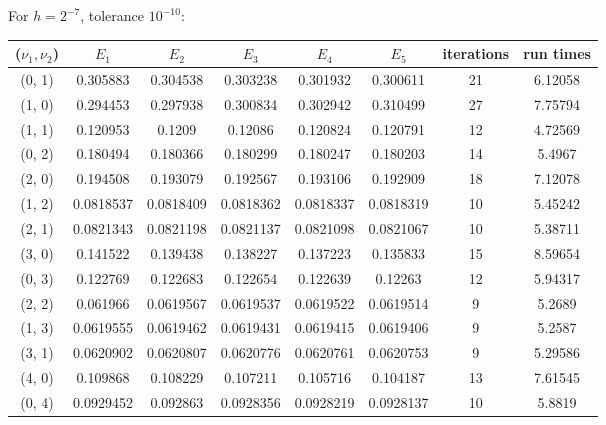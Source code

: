 \documentclass[12pt]{article}
\begin{document}
For $h=2^{-7}$, tolerance $10^{-10}$:
\begin{center}
\begin{tabular}{||c|ccccc|c|c||}
\hline \hline
 ($\nu_1, \nu_2$)   & $E_1$ & $E_2$ &  $E_3$ & $E_4$ & $E_5$ &   iterations & run times \\
\hline \hline
 \color{red}(0, 1)   & \color{red}0.305883  & \color{red}0.304538  & \color{red}0.303238  &  \color{red}0.301932  & \color{red}0.300611  & \color{red}21 &     \color{red}6.12058 \\
 (1, 0)   &  0.294453  &      0.297938  &      0.300834  &      0.302942  &      0.310499  &           27 &     7.75794 \\ \hline
 \color{red}(1, 1)   &  \color{red}0.120953  &  \color{red}0.1209    & \color{red}0.12086   & \color{red}0.120824  &  \color{red}0.120791  &     \color{red}12 &  \color{red}4.72569 \\
 (0, 2)   &  0.180494  &      0.180366  &      0.180299  &      0.180247  &      0.180203  &           14 &     5.4967  \\
 (2, 0)   &  0.194508  &      0.193079  &      0.192567  &      0.193106  &      0.192909  &           18 &     7.12078 \\ \hline
 \color{red}(1, 2)   &  \color{red}0.0818537 & \color{red}0.0818409 & \color{red}0.0818362 &  \color{red}0.0818337 &  \color{red}0.0818319 &   \color{red}10 &     5.45242 \\
 \color{red}(2, 1)   &  0.0821343 &      0.0821198 &      0.0821137 &      0.0821098 &      0.0821067 &     \color{red}10 &  \color{red}5.38711 \\
 (3, 0)   &  0.141522  &      0.139438  &      0.138227  &      0.137223  &      0.135833  &           15 &     8.59654 \\
 (0, 3)   &  0.122769  &      0.122683  &      0.122654  &      0.122639  &      0.12263   &           12 &     5.94317 \\ \hline
 \color{red}(2, 2)   &  0.061966  &      0.0619567 &      0.0619537 &      0.0619522 &      0.0619514 &  \color{red}9 & 5.2689  \\
 \color{red}(1, 3)   &  \color{red}0.0619555 & \color{red}0.0619462 & \color{red}0.0619431 &  \color{red}0.0619415 &  \color{red}0.0619406 &  \color{red}9 & \color{red}5.2587  \\
 \color{red}(3, 1)   &  0.0620902 &      0.0620807 &      0.0620776 &      0.0620761 &      0.0620753 &    \color{red}9 &     5.29586 \\
 (4, 0)   &  0.109868  &      0.108229  &      0.107211  &      0.105716  &      0.104187  &           13 &     7.61545 \\
 (0, 4)   &  0.0929452 &      0.092863  &      0.0928356 &      0.0928219 &      0.0928137 &           10 &     5.8819  \\
\hline
\end{tabular}
\end{center}
\end{document}
